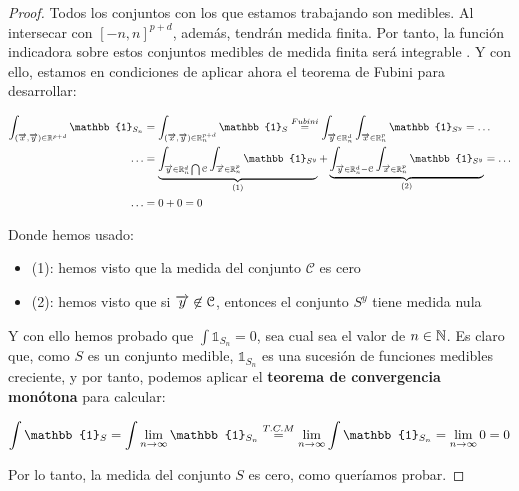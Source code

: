 \begin{proof}
    Todos los conjuntos con los que estamos trabajando son medibles. Al intersecar con $[-n, n]^{p+d}$, además, tendrán medida finita. Por tanto, la función indicadora sobre estos conjuntos medibles de medida finita será integrable \footnotemark. Y con ello, estamos en condiciones de aplicar ahora el teorema de Fubini para desarrollar:


    \begin{equation}
        \begin{split}
            \int_{(\nv{x}, \nv{y}) \in \R^{p+d}} \mathbb{1}_{S_n} &= \int_{(\nv{x},\nv{y}) \in \R_n^{p+d}} \mathbb{1}_{S} \encima{=}{Fubini} \int_{\nv{y} \in \R_n^d} \int_{\nv{x} \in \R_n^p} \mathbb{1}_{S^y} = \ldots \\
            \ldots &= \comentardebajo{\int_{\nv{y} \in \R_n^d \interseccion \mathcal{C}} \int_{\nv{x} \in \R^p_n} \mathbb{1}_{S^y}}{(1)} + \comentardebajo{\int_{\nv{y} \in \R_n^d - \mathcal{C}} \int_{\nv{x} \in \R^p_n} \mathbb{1}_{S^y}}{(2)} = \ldots \\
            \ldots &= 0 + 0 = 0
        \end{split}
    \end{equation}

    Donde hemos usado:

    \begin{itemize}
        \item (1): hemos visto que la medida del conjunto $\mathcal{C}$ es cero
        \item (2): hemos visto que si $\overrightarrow{y} \not\in \mathcal{C}$, entonces el conjunto $S^{y}$ tiene medida nula
    \end{itemize}

    Y con ello hemos probado que $\int \mathbb{1}_{S_n} = 0$, sea cual sea el valor de $n \in \mathbb{N}$. Es claro que, como $S$ es un conjunto medible, $\mathbb{1}_{S_n}$ es una sucesión de funciones medibles creciente, y por tanto, podemos aplicar el \textbf{teorema de convergencia monótona} para calcular:

    \begin{equation}
        \int \mathbb{1}_S = \int \lim_{n \to \infty} \mathbb{1}_{S_n} \encima{=}{T.C.M} \lim_{n \to \infty} \int \mathbb{1}_{S_n} = \lim_{n \to \infty} 0  = 0
    \end{equation}

    Por lo tanto, la medida del conjunto $S$ es cero, como queríamos probar.

\end{proof}

